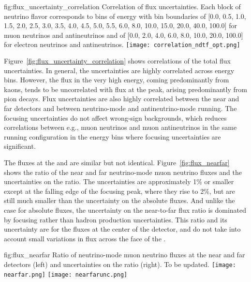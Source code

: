 \begin{dunefigure}{fig:flux_uncertainty_correlation}
{Correlation of flux uncertainties.  Each block of neutrino flavor corresponds to bins of energy with bin boundaries of [0.0, 0.5, 1.0, 1.5, 2.0, 2.5, 3.0, 3.5, 4.0, 4.5, 5.0, 5.5, 6.0, 8.0, 10.0, 15.0, 20.0, 40.0, 100.0] for muon neutrinos and antineutrinos and of [0.0, 2.0, 4.0, 6.0, 8.0, 10.0, 20.0, 100.0] for electron neutrinos and antineutrinos. }
    \texttt{[image: correlation\_ndtf\_opt.png]}\end{dunefigure}

Figure~\ref{fig:flux_uncertainty_correlation} shows correlations of the total flux uncertainties.  In general, the uncertainties are highly correlated across energy bins. However, the flux in the very high energy, coming predominantly from kaons, tends to be uncorrelated with flux at the peak, %
arising predominantly from pion decays.  Flux uncertainties are also highly correlated between the near and far detectors and between neutrino-mode and antineutrino-mode running.  The focusing uncertainties do not affect wrong-sign backgrounds, which reduces correlations between e.g., muon neutrinos and muon antineutrinos in the same running configuration in the energy bins where focusing uncertainties are significant.    

The fluxes at the  and  are similar but not identical. Figure~\ref{fig:flux_nearfar} shows the ratio of the near and far neutrino-mode muon neutrino fluxes %
and the uncertainties on the ratio.  The uncertainties are approximately 1\% or smaller except at the falling edge of the focusing peak, where they rise to 2\%, but are still much smaller than the uncertainty on the absolute fluxes.    And unlike the case for absolute fluxes, the uncertainty on the near-to-far flux ratio is dominated by focusing rather than hadron production uncertainties.  This ratio and its uncertainty are for the fluxes at the center of the detector, 
and do not take into account small variations in flux across the face of the .     

\begin{dunefigure}{fig:flux_nearfar}
{Ratio of neutrino-mode muon neutrino fluxes at the near and far detectors (left) and uncertainties on the ratio (right).  To be updated. }
    \texttt{[image: nearfar.png]}
     \texttt{[image: nearfarunc.png]}
\end{dunefigure}

